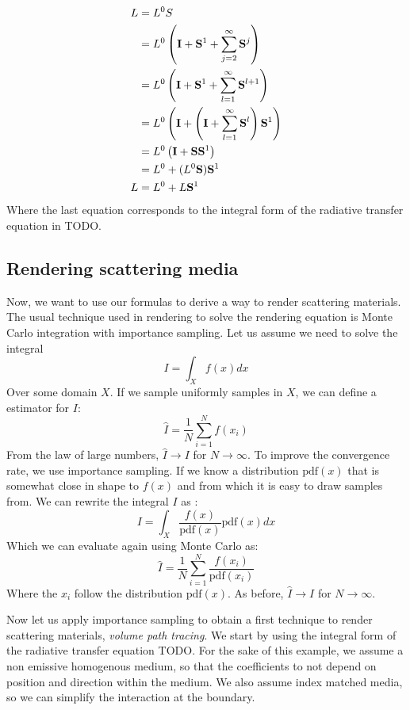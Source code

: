 \begin{equation*}
\begin{split}
L &= L^0 S \\
&= L^0 \left(\mathbf{I} + \mathbf{S}^1 + \sum_{j=2}^\infty \mathbf{S}^j \right) \\
&= L^0 \left( \mathbf{I} + \mathbf{S}^1 + \sum_{l=1}^\infty \mathbf{S}^{l+1} \right) \\
&= L^0 \left( \mathbf{I} + \left( \mathbf{I} + \sum_{l=1}^\infty \mathbf{S}^l \right) \mathbf{S}^1 \right)  \\
&= L^0 \left( \mathbf{I} + \mathbf{S} \mathbf{S}^1 \right)  \\
&= L^0 + (L^0 \mathbf{S}) \mathbf{S}^1   \\
L &= L^0 + L \mathbf{S}^1   \\
\end{split}
\end{equation*}
Where the last equation corresponds to the integral form of the radiative transfer equation in TODO.

\subsection{Rendering scattering media}
Now, we want to use our formulas to derive a way to render scattering materials. The usual technique used in rendering to solve the rendering equation is Monte Carlo integration with importance sampling. Let us assume we need to solve the integral
$$
I = \int_X f(x) dx
$$
Over some domain $X$. If we sample uniformly samples in $X$, we can define a estimator for $I$:
$$
\hat{I} = \frac{1}{N} \sum_{i=1}^N f(x_i)
$$
From the law of large numbers, $\hat{I} \rightarrow I$ for $N \rightarrow \infty$. To improve the convergence rate, we use importance sampling. If we know a distribution $\text{pdf}(x)$ that is somewhat close in shape to $f(x)$ and from which it is easy to draw samples from. We can rewrite the integral $I$ as :
$$
I = \int_X \frac{f(x)}{\text{pdf}(x)} \text{pdf}(x) dx
$$
Which we can evaluate again using Monte Carlo as:
$$
\hat{I} = \frac{1}{N} \sum_{i=1}^N \frac{f(x_i)}{\text{pdf}(x_i)}
$$
Where the $x_i$ follow the distribution $\text{pdf}(x)$. As before, $\hat{I} \rightarrow I$ for $N \rightarrow \infty$.

Now let us apply importance sampling to obtain a first technique to render scattering materials,  \emph{volume path tracing}. We start by using the integral form of the radiative transfer equation TODO. For the sake of this example, we assume a non emissive homogenous medium, so that the coefficients to not depend on position and direction within the medium. We also assume index matched media, so we can simplify the interaction at the boundary. 

